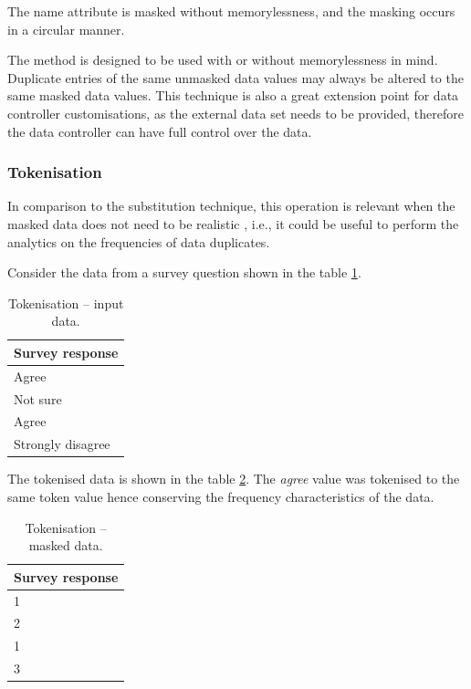 \documentclass[a4paper,twoside,12pt]{book}
\begin{document}
The name attribute is masked without memorylessness, and the masking occurs in a circular manner.

The method is designed to be used with or without memorylessness in mind. Duplicate entries of the same unmasked data values may always be altered to the same masked data values. This technique is also a great extension point for data controller customisations, as the external data set needs to be provided, therefore the data controller can have full control over the data.

\subsubsection{Tokenisation}

In comparison to the substitution technique, this operation is relevant when the masked data does not need to be realistic \cite{bib:anonymization_planning}, i.e., it could be useful to perform the analytics on the frequencies of data duplicates.

Consider the data from a survey question shown in the table \ref{id:tab:tokenisation_raw}.

\begin{table}[h]
\centering
\caption{Tokenisation – input data.}
\label{id:tab:tokenisation_raw}
\begin{tabular}{l}
\toprule
\multicolumn{1}{c}{Survey response} \\ \midrule
Agree                               \\
Not sure                            \\
Agree                               \\
Strongly disagree                   \\ \bottomrule
\end{tabular}
\end{table}

The tokenised data is shown in the table \ref{id:tab:tokenisation_masked}. The \textit{agree} value was tokenised to the same token value hence conserving the frequency characteristics of the data.

\begin{table}[h]
\centering
\caption{Tokenisation – masked data.}
\label{id:tab:tokenisation_masked}
\begin{tabular}{l}
\toprule

\multicolumn{1}{c}{Survey response} \\ \midrule
1                                   \\
2                                   \\
1                                   \\
3                                   \\ \bottomrule
\end{tabular}
\end{table}
\end{document}
